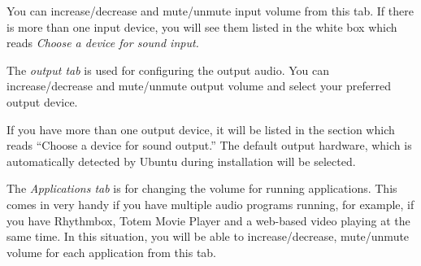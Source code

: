 You can increase/decrease and mute/unmute input volume from this tab. If there is more 
than one input device, you will see them listed in the white box
which reads \emph{Choose a device for sound input.} 

The \emph{output tab} is used for configuring the output audio. You can increase/decrease and 
mute/unmute output volume and select your preferred output device. 

If you have more than one output device, it will be listed in the section which reads ``Choose a 
device for sound output.'' The default output hardware, which is automatically detected
by Ubuntu during installation will be selected. 

The \emph{Applications tab} is for changing the volume for running applications. 
This comes in very handy if you have multiple audio programs running, for example, if 
you have Rhythmbox, Totem Movie Player and a web-based video playing at the same
time. In this situation, you will be able to increase/decrease, mute/unmute volume for each application from this tab.

